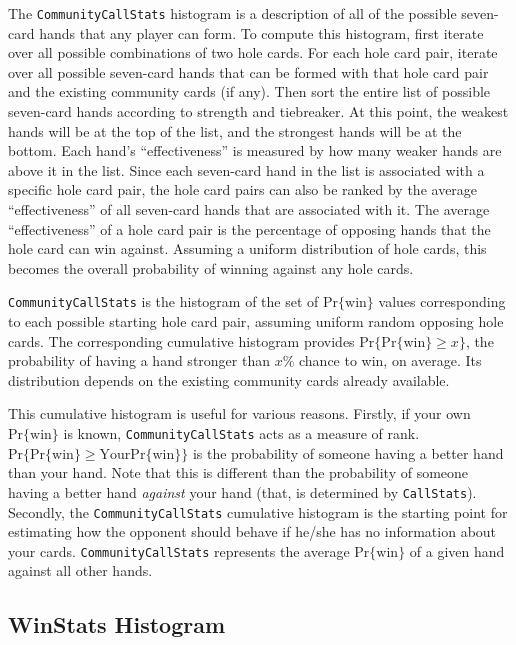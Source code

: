 The \texttt{CommunityCallStats} histogram is a description of all of the possible seven-card hands that any player can form.
To compute this histogram, first iterate over all possible combinations of two hole cards.
For each hole card pair, iterate over all possible seven-card hands that can be formed with that hole card pair and the existing community cards (if any).
Then sort the entire list of possible seven-card hands according to strength and tiebreaker.
At this point, the weakest hands will be at the top of the list, and the strongest hands will be at the bottom.
Each hand's ``effectiveness'' is measured by how many weaker hands are above it in the list.
Since each seven-card hand in the list is associated with a specific hole card pair, the hole card pairs can also be ranked by the average ``effectiveness'' of all seven-card hands that are associated with it.
The average ``effectiveness'' of a hole card pair is the percentage of opposing hands that the hole card can win against.
Assuming a uniform distribution of hole cards, this becomes the overall probability of winning against any hole cards.

\texttt{CommunityCallStats} is the histogram of the set of $\mathrm{Pr\{win\}}$ values corresponding to each possible starting hole card pair, assuming uniform random opposing hole cards.
The corresponding cumulative histogram provides $\mathrm{Pr}\{\mathrm{Pr\{win\}} \ge x\}$, the probability of having a hand stronger than $x$\% chance to win, on average.
Its distribution depends on the existing community cards already available.

This cumulative histogram is useful for various reasons.
Firstly, if your own $\mathrm{Pr\{win\}}$ is known, \texttt{CommunityCallStats} acts as a measure of rank.
$\mathrm{Pr}\{\mathrm{Pr\{win\}} \ge \mathrm{Your Pr\{win\}}\}$ is the probability of someone having a better hand than your hand.
Note that this is different than the probability of someone having a better hand \emph{against} your hand (that, is determined by \texttt{CallStats}).
Secondly, the \texttt{CommunityCallStats} cumulative histogram is the starting point for estimating how the opponent should behave if he/she has no information about your cards.
\texttt{CommunityCallStats} represents the average $\mathrm{Pr\{win\}}$ of a given hand against all other hands.


\subsection{WinStats Histogram}
\label{sec:WinStats}


